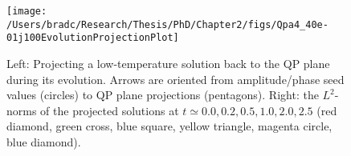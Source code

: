 \documentclass[../PhD.tex]{subfiles}
\begin{document}

\begin{figure}[h]
	\centering
	\texttt{[image: /Users/bradc/Research/Thesis/PhD/Chapter2/figs/Qpa4\_40e-01j100EvolutionProjectionPlot]}
	\caption[Taking the spectrum of a QP solution during evolution to use as a seed to find new QP solutions]{Left: Projecting a low-temperature solution back to the QP plane during its evolution. Arrows are oriented from amplitude/phase seed values (circles) to QP plane projections (pentagons). Right: the $L^2$-norms of the projected solutions at $t\simeq 0.0, 0.2, 0.5, 1.0, 2.0, 2.5$ (red diamond, green cross, blue square, yellow triangle, magenta circle, blue diamond).}
	\label{fig: Qpa4_40e-01j100EvolutionProjection}
\end{figure}

\end{document}
